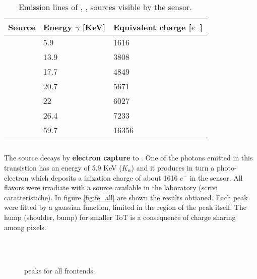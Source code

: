\begin{table}[h!]
\centering
\begin{tabular}{>{} C{3cm}|C{2.8cm}|C{2.8cm}}
Source & Energy $\gamma$ [KeV] & Equivalent charge [$e^{-}$]\\[2ex]
\hline
{} & 5.9 & 1616\\[0.5ex]
\hline
{} & 13.9 & 3808\\[0.5ex]
\hline
{} & 17.7 & 4849\\[0.5ex]
\hline
{} & 20.7 & 5671\\[0.5ex]
\hline
{} & 22 & 6027\\[0.5ex]
\hline
{} & 26.4 & 7233\\[0.5ex]
\hline
{} & 59.7 & 16356\\
\hline
\end{tabular}
\caption{Emission lines of , ,  sources visible by the sensor.}
\label{tab:radio_sources}
\end{table}

\subsection{}

The  source decays by \textbf{electron capture} to . One of the photons emitted in this transistion has an energy of 5.9 KeV ($K_{\alpha}$) and it produces in turn a photo-electron which deposits a inization charge of about 1616 $e^{-}$ in the sensor. 
All flavors were irradiate with a  source available in the laboratory (scrivi caratteristiche). In figure \vref{fig:fe_all} are shown the results obtianed. Each peak were fitted by a gaussian function, limited in the region of the peak itself. The hump (shoulder, bump) for smaller ToT is a consequence of charge sharing among pixels. 

\begin{figure}[h!]
\centering
{}\quad
{}\\
\quad
{}\\
\caption{ peaks for all frontends.}
\label{fig:fe_all}
\end{figure}

